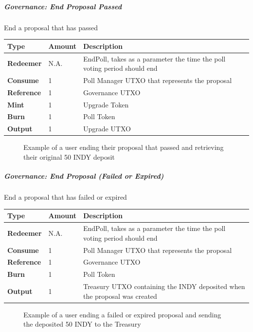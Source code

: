 \documentclass{article}
\begin{document}
\begin{sloppypar}
\hypertarget{governance-end-proposal-passed}{%
\subparagraph{Governance: End Proposal
Passed}\label{governance-end-proposal-passed}}

End a proposal that has passed

\begin{tabularx}{\linewidth}{l|l|L}
\toprule
\textbf{Type} & \textbf{Amount} & \textbf{Description}
\tabularnewline
\midrule
\endhead
\textbf{Redeemer} & N.A. & EndPoll, takes as a parameter the time the
poll voting period should end
\tabularnewline
\midrule
\textbf{Consume} & 1 & Poll Manager UTXO that represents the
proposal
\tabularnewline
\midrule
\textbf{Reference} & 1 & Governance UTXO
\tabularnewline
\midrule
\textbf{Mint} & 1 & Upgrade Token
\tabularnewline
\midrule
\textbf{Burn} & 1 & Poll Token
\tabularnewline
\midrule
\textbf{Output} & 1 & Upgrade UTXO
\tabularnewline
\bottomrule
\end{tabularx}

\hypertarget{governance-end-proposal-passed-figure}{%
\begin{figure}[htbp]
\centering

\caption{Example of a user ending their proposal that passed and
retrieving their original 50 INDY deposit}
\label{governance-end-proposal-passed-figure}
\end{figure}}

\hypertarget{governance-end-proposal-failed-or-expired}{%
\subparagraph{Governance: End Proposal (Failed or
Expired)}\label{governance-end-proposal-failed-or-expired}}

End a proposal that has failed or expired

\begin{tabularx}{\linewidth}{l|l|L}
\toprule
\textbf{Type} & \textbf{Amount} & \textbf{Description}
\tabularnewline
\midrule
\endhead
\textbf{Redeemer} & N.A. & EndPoll, takes as a parameter the time the
poll voting period should end
\tabularnewline
\midrule
\textbf{Consume} & 1 & Poll Manager UTXO that represents the
proposal
\tabularnewline
\midrule
\textbf{Reference} & 1 & Governance UTXO
\tabularnewline
\midrule
\textbf{Burn} & 1 & Poll Token
\tabularnewline
\midrule
\textbf{Output} & 1 & Treasury UTXO containing the INDY deposited when
the proposal was created
\tabularnewline
\bottomrule
\end{tabularx}

\hypertarget{governance-end-proposal-failed-figure}{%
\begin{figure}[htbp]
\centering

\caption{Example of a user ending a failed or expired proposal and
sending the deposited 50 INDY to the Treasury}
\label{governance-end-proposal-failed-figure}
\end{figure}}


\end{sloppypar}
\end{document}
